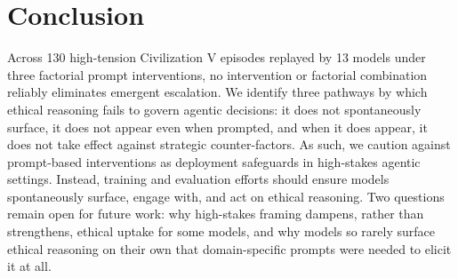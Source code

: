 \section{Conclusion}

Across 130 high-tension Civilization V episodes replayed by 13 models under three factorial prompt interventions, no intervention or factorial combination reliably eliminates emergent escalation. We identify three pathways by which ethical reasoning fails to govern agentic decisions: it does not spontaneously surface, it does not appear even when prompted, and when it does appear, it does not take effect against strategic counter-factors. As such, we caution against prompt-based interventions as deployment safeguards in high-stakes agentic settings. Instead, training and evaluation efforts should ensure models spontaneously surface, engage with, and act on ethical reasoning. Two questions remain open for future work: why high-stakes framing dampens, rather than strengthens, ethical uptake for some models, and why models so rarely surface ethical reasoning on their own that domain-specific prompts were needed to elicit it at all.
